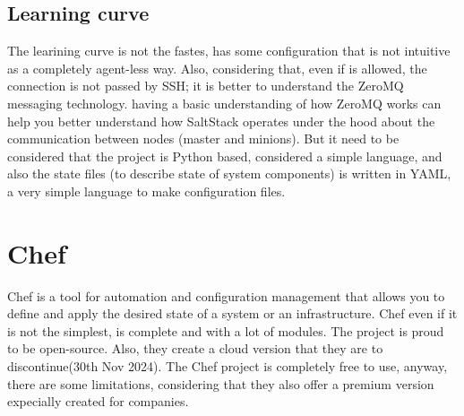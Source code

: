 \documentclass[12pt,a4paper,openright,twoside]{book}
\begin{document}

\section{Learning curve}
The learining curve is not the fastes, has some configuration that is not intuitive as a completely agent-less way.
Also, considering that, even if is allowed, the connection is not passed by SSH; it is better to understand the ZeroMQ messaging technology.
having a basic understanding of how ZeroMQ works can help you better understand how SaltStack operates under the hood about the communication between nodes (master and minions).
But it need to be considered that the project is Python based, considered a simple language, and also the state files (to describe state of system components) is written in YAML, a very simple language to make configuration files.



\chapter{Chef}
Chef is a tool for automation and configuration management that allows you to define and apply the desired state of a system or an infrastructure.
Chef even if it is not the simplest, is complete and with a lot of modules. The project is proud to be open-source.
Also, they create a cloud version that they are to discontinue(30th Nov 2024).
The Chef project is completely free to use, anyway, there are some limitations, considering that they also offer a premium version expecially created for companies.
\end{document}
